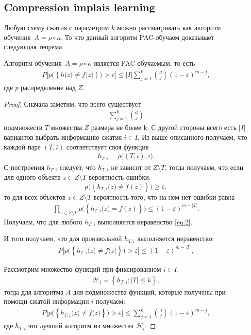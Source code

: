 \documentclass[../main.tex]{subfiles}
\begin{document}
\subsection{Compression implais learning}
Любую схему сжатия с параметром $k$ можно рассматривать как алгоритм обучения~$A = \rho \circ \kappa$. То что данный алгоритм PAC-обучаем доказывает следующая теорема.
\begin{theorem}
Алгоритм обучения~$A = \rho \circ \kappa$ является PAC-обучаемым, то есть
\[
\begin{aligned}
P\bigr[p\bigr(\left\{h\bigr(z\bigr)\not=f\bigr(z\bigr) \right\}\bigr)>\varepsilon\bigr] \leq |I|\sum_{j=1}^{k}{{d}\choose{j}}\left(1-\varepsilon\right)^{m-j},
\end{aligned}
\]
где $p$ распределение над $Z$.
\end{theorem}
\begin{proof}
Сначала заметим, что всего существует
\[
\begin{aligned}
\sum_{j=1}^{k}{{d}\choose{j}}
\end{aligned}
\]
подмножеств $T$ множества $Z$ размера не более k. С другой стороны всего есть $|I|$ вариантов выбрать информацию сжатия  $i \in I$.
Из выше описанного получаем, что каждой паре $\left(T, i\right)$ соответствует своя функция 
\[
\begin{aligned}
h_{T,i}=\rho\bigr(\left(T, i\right), i\bigr).
\end{aligned}
\]
С построения $h_{T, i}$ следует, что $h_{T, i}$ не зависит от $Z \setminus T$, тогда получаем, что если для одного объекта $z\in Z \setminus T$ вероятность ошибки:
\[
        p\bigr(\left\{h_{T,i}\bigr(z\bigr) \not=f(z)\right\}\bigr) \geq \varepsilon,
\]
то для всех объектов $z\in Z \setminus T$ вероятность того, что на нем нет ошибки равна
\[
    \label{eq:2}
    \begin{aligned}
        \prod_{z\in Z \setminus T}p\bigr(\left\{h_{T,i}\bigr(z\bigr) =f(z)\right\}\bigr) \leq \left(1-\varepsilon\right)^{m-|T|}.
    \end{aligned}
\]
Получаем, что для любого $h_{T, i}$ выполняется неравенство \eqref{eq:2}.

И того получаем, что для произвольной $h_{T, i}$ выполняется неравенство:
\[
\begin{aligned}
    P\bigr[p\bigr(\left\{h_{T, i}\bigr(z\bigr)\not=f\bigr(z\bigr) \right\}\bigr)>\varepsilon\bigr] \leq \left(1-\varepsilon\right)^{m-|T|},
\end{aligned}
\]

Рассмотрим множество функций при фиксированном $i \in I$:
\[
    \label{eq:3}
    \begin{aligned}
        \mathcal{H}_{i} = \left\{h_{T, i}: |T| \leq k\right\},
    \end{aligned}
\]
тогда для алгоритма $A$ для подмножества функций, которые получены при помощи сжатой информации $i$ получаем:
\[
\begin{aligned}
    \label{eq:4}
    P\bigr[p\bigr(\left\{h_{T, i}\bigr(z\bigr)\not=f\bigr(z\bigr) \right\}\bigr)>\varepsilon\bigr] \leq \sum_{j=1}^{k}{{d}\choose{j}}\left(1-\varepsilon\right)^{m-j},
\end{aligned}
\]
где $h_{T, i}$ это лучший алгоритм из множества $\mathcal{H}_{i}$.


\end{proof}
\end{document}
